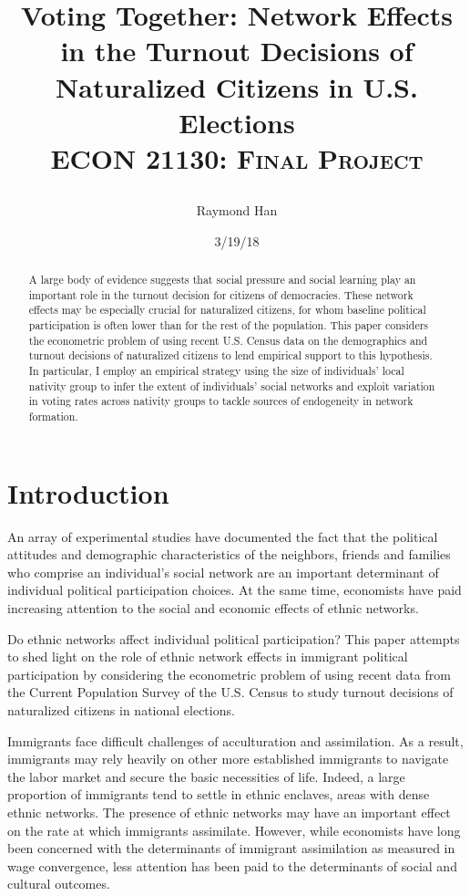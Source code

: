 \documentclass[11pt, oneside]{article}   	%
\title{\Large Voting Together: Network Effects in the Turnout Decisions of Naturalized Citizens in U.S. Elections \\
[0.5cm]
\normalsize \textsc{ECON 21130: Final Project}
\author{Raymond Han}
\date{3/19/18}}
\begin{document}
\maketitle

 \begin{abstract}
 	A large body of evidence suggests that social pressure and social learning play an important role in the turnout decision for citizens of democracies. These network effects may be especially crucial for naturalized citizens, for whom baseline political participation is often lower than for the rest of the population. This paper considers the econometric problem of using recent U.S. Census data on the demographics and turnout decisions of naturalized citizens to lend empirical support to this hypothesis. In particular, I employ an empirical strategy using the size of individuals' local nativity group to infer the extent of individuals' social networks and exploit variation in voting rates across nativity groups to tackle sources of endogeneity in network formation.
	
 \end{abstract}
 
\section{Introduction}

An array of experimental studies have documented the fact that the political attitudes and demographic characteristics of the neighbors, friends and families who comprise an individual's social network are an important determinant of individual political participation choices. At the same time, economists have paid increasing attention to the social and economic effects of ethnic networks. 

Do ethnic networks affect individual political participation? This paper attempts to shed light on the role of ethnic network effects in immigrant political participation by considering the econometric problem of using recent data from the Current Population Survey of the U.S. Census to study turnout decisions of naturalized citizens in national elections.

Immigrants face difficult challenges of acculturation and assimilation. As a result, immigrants may rely heavily on other more established immigrants to navigate the labor market and secure the basic necessities of life. Indeed, a large proportion of immigrants tend to settle in ethnic enclaves, areas with dense ethnic networks. The presence of ethnic networks may have an important effect on the rate at which immigrants assimilate. However, while economists have long been concerned with the determinants of immigrant assimilation as measured in wage convergence, less attention has been paid to the determinants of social and cultural outcomes. 
\end{document}
